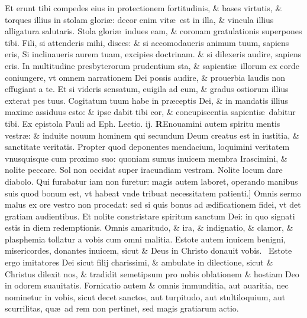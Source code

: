 \documentclass[a5paper,10pt]{book}
\def\leftmarginnote{%
	\lrmarginnote{\hskip -\marginparsep \hskip -6.5em}}
\def\rightmarginnote{%
	\lrmarginnote{\hskip\columnwidth \hskip -1em}}
\def\ae{æ}
\begin{document}
\begin{multicols*}{2}
Et erunt tibi compedes eius in protectionem fortitudinis, \& bases virtutis, \& torques illius in stolam glori\ae : decor enim vit\ae \ est in illa, \& vincula illius alligatura salutaris.
Stola glori\ae \ indues eam, \& coronam gratulationis superpones tibi. Fili, si attenderis mihi, disces: \& si accomodaueris animum tuum, sapiens eris, Si inclinaueris aurem tuam, excipies doctrinam. \& si dilexeris audire, sapiens eris.
In multitudine presbyterorum prudentium sta, \& sapienti\ae \ illorum ex corde coniungere, vt omnem narrationem Dei possis audire, \& prouerbia laudis non effugiant a te.
Et si videris sensatum, euigila ad eum, \& gradus ostiorum illius exterat pes
tuus. Cogitatum tuum habe in pr\ae ceptis Dei, \& in mandatis illius maxime assiduus esto: \& ipse dabit tibi cor, \& concupiscentia sapienti\ae \ dabitur tibi.
\newline {} \color{red} Ex epistola Pauli ad Eph. \hfill Lectio. ij. \color{black}
\vspace{-2.25em}
\lettrine[lines=2]{\bfseries \color{red} R}{}\textdagger Enouamini\leftmarginnote{\begin{flushright}c.4.d\end{flushright}} autem spiritu mentis vestr\ae : \& induite nouum hominem qui secundum Deum creatus est in iustitia, \& sanctitate veritatis.
Propter quod deponentes mendacium, loquimini veritatem vnusquisque cum proximo suo: quoniam sumus inuicem membra Irascimini, \& nolite peccare.
Sol non occidat super iracundiam vestram. Nolite locum dare diabolo. Qui furabatur iam non furetur: magis autem laboret, operando manibus suis quod bonum est, vt habeat vnde tribuat necessitatem\leftmarginnote{\begin{flushright}E\end{flushright}} patienti.]
Omnis sermo malus ex ore vestro non procedat: sed si quis bonus ad \ae dificationem fidei, vt det gratiam audientibus.
Et nolite constristare spiritum sanctum Dei: in quo signati estis in diem redemptionis.
Omnis amaritudo, \& ira, \& indignatio, \& clamor, \& plasphemia tollatur a vobis cum omni malitia. Estote autem inuicem benigni, misericordes, donantes inuicem, sicut \& Deus in Christo donauit vobis.
\newline \textdagger \ Estote\rightmarginnote{c.5.a} ergo imitatores Dei sicut filij charissimi, \& ambulate in dilectione, sicut \& Christus dilexit nos, \& tradidit semetipsum pro nobis oblationem \& hostiam Deo in odorem suauitatis.
Fornicatio autem \& omnis immunditia, aut auaritia, nec nominetur in vobis, sicut decet sanctos, aut turpitudo, aut stultiloquium, aut scurrilitas, qu\ae \ ad rem non pertinet, sed magis gratiarum actio.

\end{multicols*}
\end{document}
